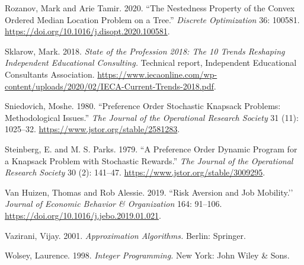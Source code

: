 \documentclass[11pt]{article} %
\theoremstyle{definition}
\theoremstyle{definition}
\begin{document}

Rozanov, Mark and Arie Tamir. 2020. ``The Nestedness Property of the Convex Ordered Median Location Problem on a Tree.'' \emph{Discrete Optimization} 36: 100581. \url{https://doi.org/10.1016/j.disopt.2020.100581}.

Sklarow, Mark. 2018. \emph{State of the Profession 2018: The 10 Trends Reshaping Independent Educational Consulting.} Technical report, Independent Educational Consultants Association. \url{https://www.iecaonline.com/wp-content/uploads/2020/02/IECA-Current-Trends-2018.pdf}.

Sniedovich, Moshe. 1980. ``Preference Order Stochastic Knapsack Problems: Methodological Issues.'' \emph{The Journal of the Operational Research Society} 31 (11): 1025--32. \url{https://www.jstor.org/stable/2581283}. 

Steinberg, E. and M. S. Parks. 1979. ``A Preference Order Dynamic Program for a Knapsack Problem with Stochastic Rewards.'' \emph{The Journal of the Operational Research Society} 30 (2): 141--47. \url{https://www.jstor.org/stable/3009295}. 


Van Huizen, Thomas and Rob Alessie. 2019. ``Risk Aversion and Job Mobility.’’ \emph{Journal of Economic Behavior \& Organization} 164: 91--106. \url{https://doi.org/10.1016/j.jebo.2019.01.021}.

Vazirani, Vijay. 2001. \emph{Approximation Algorithms.} Berlin: Springer. 

Wolsey, Laurence. 1998. \emph{Integer Programming.} New York: John Wiley \& Sons. 
\end{document}
